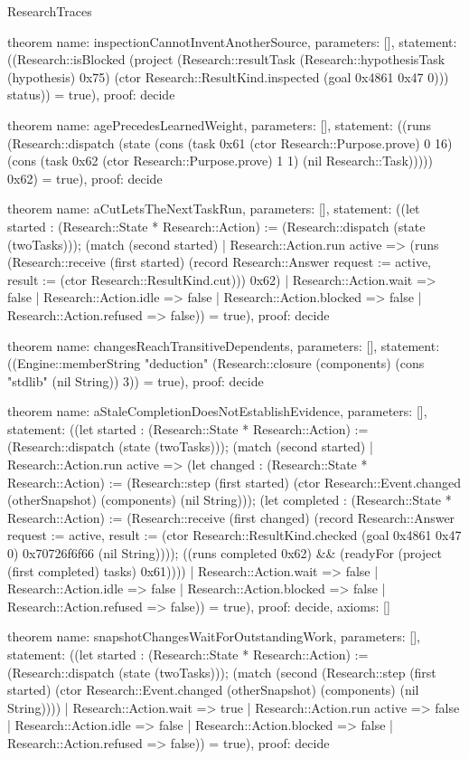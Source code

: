 \begin{lexlean}{ResearchTraces}
\begin{semanticmodule}
theorem{
  name: inspectionCannotInventAnotherSource,
  parameters: [],
  statement: ((Research::isBlocked (project (Research::resultTask (Research::hypothesisTask (hypothesis) 0x75) (ctor Research::ResultKind.inspected (goal 0x4861 0x47 0))) status)) = true),
  proof: decide{}
}

theorem{
  name: agePrecedesLearnedWeight,
  parameters: [],
  statement: ((runs (Research::dispatch (state (cons (task 0x61 (ctor Research::Purpose.prove) 0 16) (cons (task 0x62 (ctor Research::Purpose.prove) 1 1) (nil Research::Task))))) 0x62) = true),
  proof: decide{}
}

theorem{
  name: aCutLetsTheNextTaskRun,
  parameters: [],
  statement: ((let started : (Research::State * Research::Action) := (Research::dispatch (state (twoTasks))); (match (second started)
    | Research::Action.run active => (runs (Research::receive (first started) (record Research::Answer {request := active, result := (ctor Research::ResultKind.cut)})) 0x62)
    | Research::Action.wait => false
    | Research::Action.idle => false
    | Research::Action.blocked => false
    | Research::Action.refused => false)) = true),
  proof: decide{}
}

theorem{
  name: changesReachTransitiveDependents,
  parameters: [],
  statement: ((Engine::memberString "deduction" (Research::closure (components) (cons "stdlib" (nil String)) 3)) = true),
  proof: decide{}
}

theorem{
  name: aStaleCompletionDoesNotEstablishEvidence,
  parameters: [],
  statement: ((let started : (Research::State * Research::Action) := (Research::dispatch (state (twoTasks))); (match (second started)
    | Research::Action.run active => (let changed : (Research::State * Research::Action) := (Research::step (first started) (ctor Research::Event.changed (otherSnapshot) (components) (nil String))); (let completed : (Research::State * Research::Action) := (Research::receive (first changed) (record Research::Answer {request := active, result := (ctor Research::ResultKind.checked (goal 0x4861 0x47 0) 0x70726f6f66 (nil String))})); ((runs completed 0x62) && (readyFor (project (first completed) tasks) 0x61))))
    | Research::Action.wait => false
    | Research::Action.idle => false
    | Research::Action.blocked => false
    | Research::Action.refused => false)) = true),
  proof: decide{},
  axioms: []
}

theorem{
  name: snapshotChangesWaitForOutstandingWork,
  parameters: [],
  statement: ((let started : (Research::State * Research::Action) := (Research::dispatch (state (twoTasks))); (match (second (Research::step (first started) (ctor Research::Event.changed (otherSnapshot) (components) (nil String))))
    | Research::Action.wait => true
    | Research::Action.run active => false
    | Research::Action.idle => false
    | Research::Action.blocked => false
    | Research::Action.refused => false)) = true),
  proof: decide{}
}


\end{semanticmodule}
\end{lexlean}
